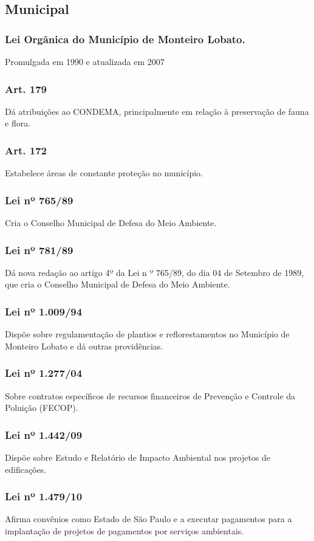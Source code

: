 \begin{subapend}
	\subsection{Municipal}
	\begin{subsubapend}
		\item \subsubsection{Lei Orgânica do Município de Monteiro Lobato.} 
		Promulgada em 1990 e atualizada em 2007
		\subsubsection{Art. 179}
		Dá atribuições ao CONDEMA, principalmente em relação à preservação de fauna e flora.
		\subsubsection{Art. 172}
		Estabelece áreas de constante proteção no município.
		\subsubsection{Lei nº 765/89}
		Cria o Conselho Municipal de Defesa do Meio Ambiente.
		\subsubsection{Lei nº 781/89}
		Dá nova redação ao artigo 4º da Lei n º 765/89, do dia 04 de Setembro de 1989, que cria o Conselho Municipal de Defesa do Meio Ambiente.
		\subsubsection{Lei nº 1.009/94}
		Dispõe sobre regulamentação de plantios e reflorestamentos no Município de Monteiro Lobato e dá outras providências.
		\subsubsection{Lei nº 1.277/04}
		Sobre contratos específicos de recursos financeiros de Prevenção e Controle da Poluição (FECOP).
		\subsubsection{Lei nº 1.442/09}
		Dispõe sobre Estudo e Relatório de Impacto Ambiental nos projetos de edificações.
		\subsubsection{Lei nº 1.479/10}
		Afirma convênios como Estado de São Paulo e a executar pagamentos para a implantação de projetos de pagamentos por serviços ambientais.

\end{subsubapend}
\end{subapend}
